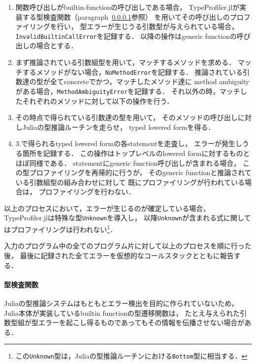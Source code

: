 \begin{enumerate}
  \item 関数呼び出しがbuiltin-functionの呼び出しである場合，
        TypeProfiler.jlが実装する型検査関数（paragraph~\ref{paragraph:type-check-function}参照）
        を用いてその呼び出しのプロファイリングを行い，
        型エラーが生じうる引数型が与えられている場合，
        \verb|InvalidBuiltinCallError|を記録する．
        以降の操作はgeneric functionの呼び出しの場合とする．
  \item まず推論されている引数組型を用いて，マッチするメソッドを求める．
        マッチするメソッドがない場合，\verb|NoMethodError|を記録する．
        推論されている引数達の型が全てconcreteでかつ，マッチしたメソッド達に
        method ambiguityがある場合，\verb|MethodAmbiguityError|を記録する．
        それ以外の時，マッチしたそれぞれのメソッドに対して以下の操作を行う．
  \item その時点で得られている引数達の型を用いて，
        そのメソッドの呼び出しに対しJuliaの型推論ルーチンを走らせ，
        typed lowered formを得る．
  \item 3.で得られるtyped lowered formの各statementを走査し，
        エラーが発生しうる箇所を記録する．
        この操作はトップレベルのlowered formに対するものとほぼ同様である．
        statementにgeneric function呼び出しが含まれる場合，
        この型プロファイリングを再帰的に行うが，
        そのgeneric functionと推論されている引数組型の組み合わせに対して
        既にプロファイリングが行われている場合は，
        プロファイリングを行わない．
\end{enumerate}

以上のプロセスにおいて，エラーが生じるのが確定している場合，
TypeProfiler.jlは特殊な型\verb|Unknown|を導入し，
以降\verb|Unknown|が含まれる式に関してはプロファイリングは行われない\footnote{
  この\texttt{Unknown}型は，Juliaの型推論ルーチンにおける\texttt{Bottom}型に相当する．
}．

入力のプログラム中の全てのプログラム片に対して以上のプロセスを順に行った後，
最後に記録された全てエラーを仮想的なコールスタックとともに報告する．

\paragraph{型検査関数} \label{paragraph:type-check-function}

Juliaの型推論システムはもともとエラー検出を目的に作られていないため，
Julia本体が実装しているbuiltin functionの型遷移関数は，
たとえ与えられた引数型組が型エラーを起こし得るものであってもその情報を伝播させない場合がある．

